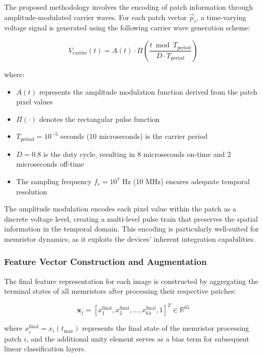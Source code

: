 \documentclass[11pt, oneside]{article}
\begin{document}
The proposed methodology involves the encoding of patch information through amplitude-modulated carrier waves. For each patch vector \(\vec{p}_i\), a time-varying voltage signal is generated using the following carrier wave generation scheme:

\begin{equation}
    V_{\text{carrier}}(t) = A(t) \cdot \Pi\left(\frac{t \bmod T_{\text{period}}}{D \cdot T_{\text{period}}}\right)
\end{equation}

where:
\begin{itemize}
    \item \(A(t)\) represents the amplitude modulation function derived from the patch pixel values
    \item \(\Pi(\cdot)\) denotes the rectangular pulse function
    \item \(T_{\text{period}} = 10^{-5}\) seconds (10 microseconds) is the carrier period
    \item \(D = 0.8\) is the duty cycle, resulting in 8 microseconds on-time and 2 microseconds off-time
    \item The sampling frequency \(f_s = 10^7\) Hz (10 MHz) ensures adequate temporal resolution
\end{itemize}

The amplitude modulation encodes each pixel value within the patch as a discrete voltage level, creating a multi-level pulse train that preserves the spatial information in the temporal domain. This encoding is particularly well-suited for memristor dynamics, as it exploits the devices' inherent integration capabilities.


\subsubsection{Feature Vector Construction and Augmentation}

The final feature representation for each image is constructed by aggregating the terminal states of all memristors after processing their respective patches:

\begin{equation}
    \mathbf{x}_j = [x_1^{\text{final}}, x_2^{\text{final}}, ..., x_{64}^{\text{final}}, 1]^T \in \mathbb{R}^{65}
\end{equation}

where \(x_i^{\text{final}} = x_i(t_{\text{max}})\) represents the final state of the memristor processing patch \(i\), and the additional unity element serves as a bias term for subsequent linear classification layers.
\end{document}
